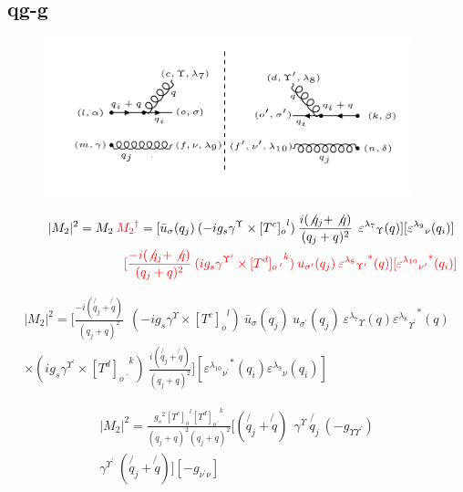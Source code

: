 \subsection{qg-g}
\begin{figure}[ht!]
\centering
\includegraphics[width=0.95\textwidth]{images/qggM2squer.png}
\end{figure}
\begin{equation}
\begin{split}
|M_2|^2=M_2\:{\color[RGB]{255,0,0} {M_2}^{\dagger}} = [{\bar{u}}_{\sigma}(q_j)\: (-ig_s \gamma^{\Upsilon}\times {[T^c]_o}^l) \: \frac{i(\not{q_j} + \not{q})}{(q_j + q)^2}\:\: {\varepsilon^{\lambda_7}}_{\Upsilon} (q)] [{\varepsilon^{\lambda_9}}_{\nu} (q_i)]\: \\
\quad\quad\quad\quad\quad\quad\quad\quad\:\:{\color[RGB]{255,0,0}[\frac{-i(\not{q_j} + \not{q})}{(q_j + q)^2} \:  (ig_s \gamma^{{\Upsilon}^{\prime}}\times {[T^d]_{o\:^{\prime}}}^k) \: u_{{\sigma}^{\prime}}(q_j) \: {{\varepsilon^{\lambda_8}}_{{\Upsilon}^{\prime}}}^* (q)][{{\varepsilon^{\lambda_{10}}}_{{\nu}^{\prime}}}^* (q_i)]}
\end{split}
\end{equation}

\begin{equation}
\begin{split}
|M_2|^2=[\frac{-i(\not{q_j} + \not{q})}{(q_j + q)^2} \:
 \:  (-ig_s \gamma^{\Upsilon}\times {[T^c]_o}^l) \: {\bar{u}}_{\sigma}(q_j)\:u_{{\sigma}^{\prime}}(q_j) \: {\varepsilon^{\lambda_7}}_{\Upsilon} (q) {{\varepsilon^{\lambda_8}}_{{\Upsilon}^{\prime}}}^* (q) \\
\times (ig_s \gamma^{{\Upsilon}^{\prime}}\times {[T^d]_{o\:^{\prime}}}^k) \: \frac{i(\not{q_j} + \not{q})}{(q_j + q)^2} ]
[{{\varepsilon^{\lambda_{10}}}_{{\nu}^{\prime}}}^* (q_i) {\varepsilon^{\lambda_9}}_{\nu} (q_i)]
\end{split}
\end{equation}

\begin{equation}
\begin{split}
|M_2|^2=\frac{{g_s}^2 {[T^c]_o}^l {[T^d]_{o\:^{\prime}}}^k}{(q_j + q)^2 (q_j + q)^2}
[(\not{q_j} + \not{q}) \:
 \:  \gamma^{\Upsilon} \: \not{q_j} \: (-g_{{\Upsilon}{{\Upsilon}^{\prime}}}) \\
\gamma^{{\Upsilon}^{\prime}} \: (\not{q_j} + \not{q})]
[-g_{{\nu}^{\prime}{\nu}}]
\end{split}
\end{equation}

